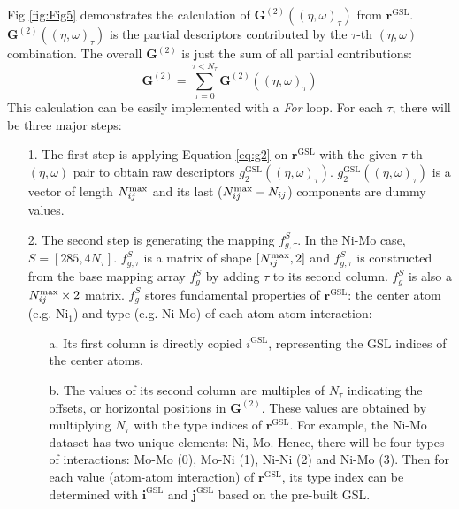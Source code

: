 \documentclass[preprint]{revtex4-2}
\begin{document}
Fig \ref{fig:Fig5} 
demonstrates the calculation of $\mathbf{G}^{(2)}((\eta, \omega)_{\tau})$ from 
$\mathbf{r}^{\mathrm{GSL}}$. $\mathbf{G}^{(2)}((\eta, \omega)_{\tau})$ is the 
partial descriptors contributed by the $\tau$-th $(\eta, \omega)$ combination.
The overall $\mathbf{G}^{(2)}$ is just the sum of all partial contributions:
\begin{equation}
\mathbf{G}^{(2)} = \sum_{\tau=0}^{\tau < N_{\tau}}{
    \mathbf{G}^{(2)}((\eta, \omega)_{\tau})
}
\end{equation}
This calculation can be easily implemented with a \textit{For} loop. For each 
$\tau$, there will be three major steps:

\begin{itemize}
    
    \item[1.]
    The first step is applying Equation \ref{eq:g2} on 
    $\mathbf{r}^{\mathrm{GSL}}$ with the given $\tau$-th $(\eta, \omega)$ pair 
    to obtain raw descriptors $g^{\mathrm{GSL}}_{2}((\eta, \omega)_{\tau})$. 
    $g^{\mathrm{GSL}}_{2}((\eta, \omega)_{\tau})$ is a vector of length 
    $N_{ij}^{\mathrm{max}}$ and its last ($N_{ij}^{\mathrm{max}} - N_{ij}$) components are dummy values.
    
    \item[2.]
    The second step is generating the mapping $f_{g,\tau}^{S}$. In the Ni-Mo 
    case, $S=[285, 4N_{\tau}]$. $f_{g,\tau}^{S}$ is a matrix of shape 
    $[N_{ij}^{\mathrm{max}}, 2]$ and $f_{g,\tau}^{S}$ is constructed from the base mapping 
    array $f_{g}^{S}$ by adding $\tau$ to its second column. $f_{g}^{S}$ is also
    a $N_{ij}^{\mathrm{max}} \times 2$ matrix. $f_{g}^{S}$ stores fundamental properties of 
    $\mathbf{r}^{\mathrm{GSL}}$: the center atom (e.g. $\mathrm{Ni}_{1}$) and 
    type (e.g. Ni-Mo) of each atom-atom interaction:
    \begin{itemize}

        \item[a.] 
        Its first column is directly copied $i^{\mathrm{GSL}}$, representing the 
        GSL indices of the center atoms.
        
        \item[b.] 
        The values of its second column are multiples of $N_{\tau}$ indicating 
        the offsets, or horizontal positions in $\mathbf{G}^{(2)}$. These values 
        are obtained by multiplying $N_{\tau}$ with the type indices of 
        $\mathbf{r}^{\mathrm{GSL}}$. For example, the Ni-Mo dataset has two 
        unique elements: Ni, Mo. Hence, there will be four types of interactions:
        Mo-Mo (0), Mo-Ni (1), Ni-Ni (2) and Ni-Mo (3). Then for each value 
        (atom-atom interaction) of $\mathbf{r}^{\mathrm{GSL}}$, its type index 
        can be determined with $\mathbf{i}^{\mathrm{GSL}}$ and 
        $\mathbf{j}^{\mathrm{GSL}}$ based on the pre-built GSL.


\end{itemize}
\end{itemize}
\end{document}
